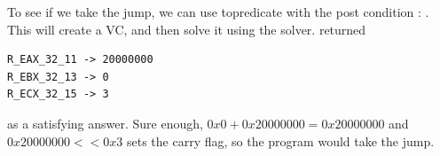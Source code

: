 

To see if we take the jump, we can use topredicate with the post
condition : .  This will create a VC, and then
solve it using the  solver.   returned
\begin{verbatim}
R_EAX_32_11 -> 20000000
R_EBX_32_13 -> 0
R_ECX_32_15 -> 3
\end{verbatim}
as a satisfying answer. Sure enough, $0x0 + 0x20000000 = 0x20000000$
and $0x20000000 << 0x3$ sets the carry flag, so the program would take
the jump.

